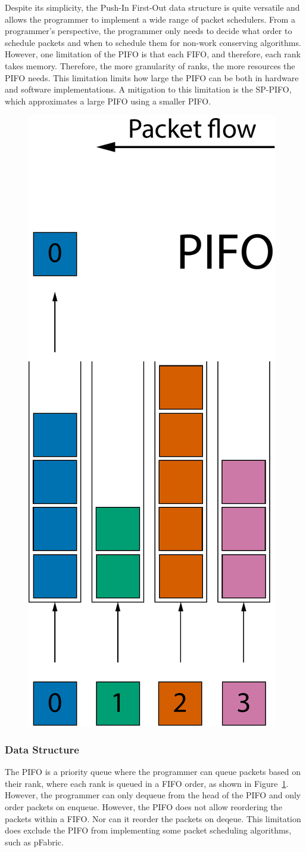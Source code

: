 \documentclass[sigconf, nonacm]{acmart}
\begin{document}
Despite its simplicity, the Push-In First-Out data structure\cite{Sivaraman2016} is quite versatile and allows the programmer to implement a wide range of packet schedulers. From a programmer's perspective, the programmer only needs to decide what order to schedule packets and when to schedule them for non-work conserving algorithms. However, one limitation of the PIFO is that each FIFO, and therefore, each rank takes memory. Therefore, the more granularity of ranks, the more resources the PIFO needs. This limitation limits how large the PIFO can be both in hardware and software implementations. A mitigation to this limitation is the SP-PIFO\cite{Alcoz2020}, which approximates a large PIFO using a smaller PIFO.

\begin{figure}
  \includegraphics[width=0.25\linewidth]{pifo.pdf}
  \caption{}
  \label{fig:pifo}
\end{figure}

\subsubsection{Data Structure}

The PIFO is a priority queue where the programmer can queue packets based on their rank, where each rank is queued in a FIFO order, as shown in Figure~\ref{fig:pifo}. However, the programmer can only dequeue from the head of the PIFO and only order packets on enqueue. However, the PIFO does not allow reordering the packets within a FIFO. Nor can it reorder the packets on deqeue. This limitation does exclude the PIFO from implementing some packet scheduling algorithms, such as pFabric\cite{alizadeh2013pfabric}.
\end{document}
